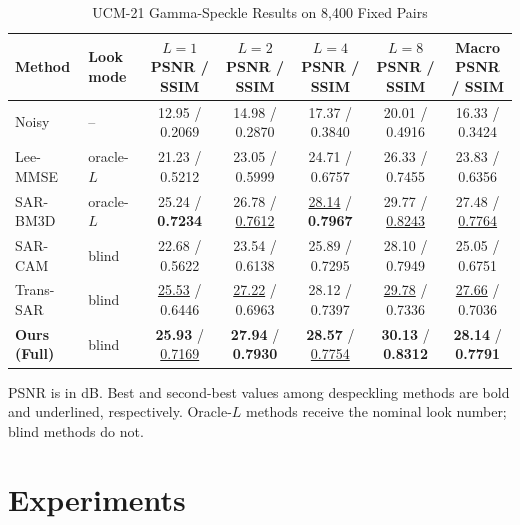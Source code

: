 \documentclass[conference]{IEEEtran}
\begin{document}
\begin{table}[!b]
\caption{UCM-21 Gamma-Speckle Results on 8,400 Fixed Pairs}
\label{tab:main}
\centering
\footnotesize
\setlength{\tabcolsep}{3.2pt}
\renewcommand{\arraystretch}{1.08}
\begin{tabular*}{0.86\textwidth}{@{\extracolsep{\fill}}llccccc@{}}
\toprule
\textbf{Method} & \textbf{Look mode} &
\shortstack{\(L=1\)\\PSNR / SSIM} &
\shortstack{\(L=2\)\\PSNR / SSIM} &
\shortstack{\(L=4\)\\PSNR / SSIM} &
\shortstack{\(L=8\)\\PSNR / SSIM} &
\shortstack{Macro\\PSNR / SSIM} \\
\midrule
Noisy       & --                & 12.95 / 0.2069 & 14.98 / 0.2870 & 17.37 / 0.3840 & 20.01 / 0.4916 & 16.33 / 0.3424 \\
Lee-MMSE    & oracle-\(L\)      & 21.23 / 0.5212 & 23.05 / 0.5999 & 24.71 / 0.6757 & 26.33 / 0.7455 & 23.83 / 0.6356 \\
SAR-BM3D    & oracle-\(L\)      & 25.24 / \textbf{0.7234} & 26.78 / \underline{0.7612} & \underline{28.14} / \textbf{0.7967} & 29.77 / \underline{0.8243} & 27.48 / \underline{0.7764} \\
SAR-CAM     & blind             & 22.68 / 0.5622 & 23.54 / 0.6138 & 25.89 / 0.7295 & 28.10 / 0.7949 & 25.05 / 0.6751 \\
Trans-SAR   & blind             & \underline{25.53} / 0.6446 & \underline{27.22} / 0.6963 & 28.12 / 0.7397 & \underline{29.78} / 0.7336 & \underline{27.66} / 0.7036 \\
\textbf{Ours (Full)} & blind    & \textbf{25.93} / \underline{0.7169} & \textbf{27.94} / \textbf{0.7930} & \textbf{28.57} / \underline{0.7754} & \textbf{30.13} / \textbf{0.8312} & \textbf{28.14} / \textbf{0.7791} \\
\bottomrule
\end{tabular*}
\vspace{1pt}
\parbox{0.86\textwidth}{\scriptsize PSNR is in dB. Best and second-best values among despeckling methods are bold and underlined, respectively. Oracle-\(L\) methods receive the nominal look number; blind methods do not.}
\end{table}

\section{Experiments}
\end{document}
